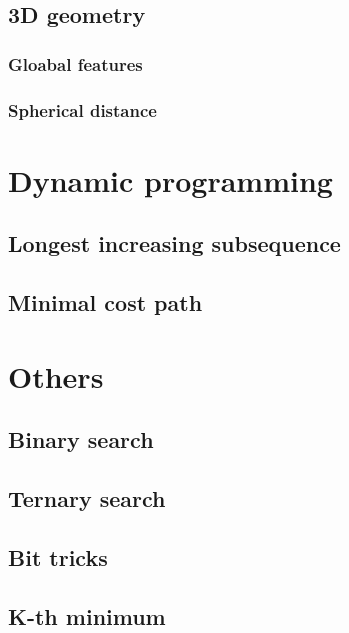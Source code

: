 \documentclass[a4paper]{article}
\begin{document}
\begin{multicols*}{3}
    \subsection{3D geometry}
        \subsubsection{Gloabal features}
            
        \subsubsection{Spherical distance}
            
\section{Dynamic programming}
    \subsection{Longest increasing subsequence}
        
    \subsection{Minimal cost path}
        
\section{Others}
    \subsection{Binary search}
        
    \subsection{Ternary search}
        
    \subsection{Bit tricks}
        
    \subsection{K-th minimum}
        

\end{multicols*}
\end{document}
